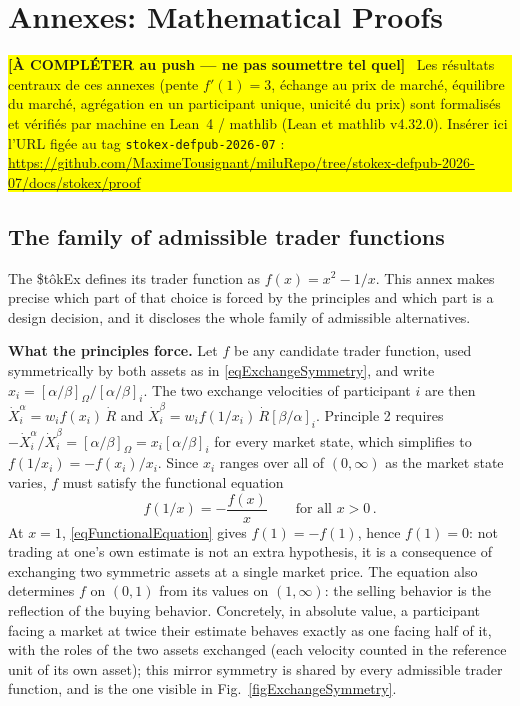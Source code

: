 \documentclass[letterpaper]{article}
\newcommand{\priceAB}{\left[\alpha / \beta\right]}
\newcommand{\priceBA}{\left[\beta / \alpha\right]}
\newcommand{\StokEx}{\$t\^{o}kEx}
\newcommand{\placeholder}[1]{%
  \par\smallskip\noindent
  \colorbox{yellow}{\parbox{\dimexpr\linewidth-2\fboxsep\relax}{#1}}%
  \par\smallskip}
\begin{document}
\section{Annexes: Mathematical Proofs}

\placeholder{\textbf{[À COMPLÉTER au push --- ne pas soumettre tel quel]}~ Les
résultats centraux de ces annexes (pente $f'(1)=3$, échange au prix de marché,
équilibre du marché, agrégation en un participant unique, unicité du prix) sont
formalisés et vérifiés par machine en Lean~4 / mathlib (Lean et mathlib
v4.32.0). Insérer ici l'URL figée au tag \texttt{stokex-defpub-2026-07} :
\url{https://github.com/MaximeTousignant/miluRepo/tree/stokex-defpub-2026-07/docs/stokex/proof}}

\subsection{The family of admissible trader functions}\label{secTraderFamily}

The \StokEx{} defines its trader function as $f(x) = x^2 - 1/x$. This annex makes precise which part of that choice is forced by the principles and which part is a design decision, and it discloses the whole family of admissible alternatives.

\textbf{What the principles force.} Let $f$ be any candidate trader function, used symmetrically by both assets as in \eqref{eqExchangeSymmetry}, and write $x_i = \priceAB_\Omega / \priceAB_i$. The two exchange velocities of participant $i$ are then $\dot{X}^\alpha_i = w_i f(x_i)\, \dot{R}$ and $\dot{X}^\beta_i = w_i f(1/x_i)\, \dot{R} \priceBA_i$. Principle 2 requires $-\dot{X}^\alpha_i / \dot{X}^\beta_i = \priceAB_\Omega = x_i \priceAB_i$ for every market state, which simplifies to $f(1/x_i) = -f(x_i)/x_i$. Since $x_i$ ranges over all of $(0,\infty)$ as the market state varies, $f$ must satisfy the functional equation
\begin{equation}
    f(1/x) = -\frac{f(x)}{x} \qquad \text{for all } x > 0\,. \label{eqFunctionalEquation}
\end{equation}
At $x = 1$, \eqref{eqFunctionalEquation} gives $f(1) = -f(1)$, hence $f(1) = 0$: not trading at one's own estimate is not an extra hypothesis, it is a consequence of exchanging two symmetric assets at a single market price. The equation also determines $f$ on $(0,1)$ from its values on $(1,\infty)$: the selling behavior is the reflection of the buying behavior. Concretely, in absolute value, a participant facing a market at twice their estimate behaves exactly as one facing half of it, with the roles of the two assets exchanged (each velocity counted in the reference unit of its own asset); this mirror symmetry is shared by every admissible trader function, and is the one visible in Fig.~\ref{figExchangeSymmetry}.
\end{document}
